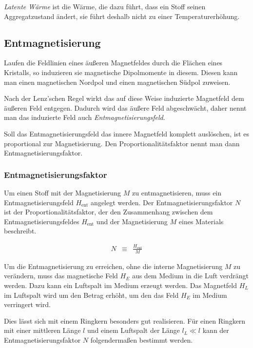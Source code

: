 \documentclass[12pt,a4paper]{scrartcl}
\numberwithin{equation}{section} %
\begin{document}
\emph{Latente Wärme} ist die Wärme, die dazu führt, dass ein Stoff
seinen Aggregatzustand ändert, sie führt deshalb nicht zu einer
Temperaturerhöhung.

\hypertarget{entmagnetisierung}{%
\subsection{Entmagnetisierung}\label{entmagnetisierung}}

Laufen die Feldlinien eines äußeren Magnetfeldes durch die Flächen eines
Kristalls, so induzieren sie magnetische Dipolmomente in diesem. Diesen
kann man einen magnetischen Nordpol und einen magnetischen Südpol
zuweisen.

Nach der Lenz'schen Regel wirkt das auf diese Weise induzierte
Magnetfeld dem äußeren Feld entgegen. Dadurch wird das äußere Feld
abgeschwächt, daher nennt man das induzierte Feld auch
\emph{Entmagnetisierungsfeld}.

Soll das Entmagnetisierungsfeld das innere Magnetfeld komplett
auslöschen, ist es proportional zur Magnetisierung. Den
Proportionalitätsfaktor nennt man dann Entmagnetisierungsfaktor.

\hypertarget{entmagnetisierungsfaktor}{%
\subsubsection{Entmagnetisierungsfaktor}\label{entmagnetisierungsfaktor}}

Um einen Stoff mit der Magnetisierung $M$ zu entmagnetisieren, muss
ein Entmagnetisierungsfeld $H_\mathrm{ent}$ angelegt werden. Der
Entmagnetisierungsfaktor $N$ ist der Proportionalitätsfaktor, der den
Zusammenhang zwischen dem Entmagnetisierungsfeldes $H_\mathrm{ent}$
und der Magnetisierung $M$ eines Materials beschreibt.

\begin{eqnarray}
    N &\equiv& \frac{H_\mathrm{ent}}{M}
\end{eqnarray}

Um die Entmagnetisierung zu erreichen, ohne die interne Magnetisierung
$M$ zu verändern, muss das magnetische Feld $H_E$ aus dem Medium in
die Luft verdrängt werden. Dazu kann ein Luftspalt im Medium erzeugt
werden. Das Magnetfeld $H_L$ im Luftspalt wird um den Betrag erhöht,
um den das Feld $H_E$ im Medium verringert wird.

Dies lässt sich mit einem Ringkern besonders gut realisieren. Für einen
Ringkern mit einer mittleren Länge $l$ und einem Luftspalt der Länge
$l_L\ll l$ kann der Entmagnetisierungsfaktor $N$ folgendermaßen
bestimmt werden.
\end{document}
